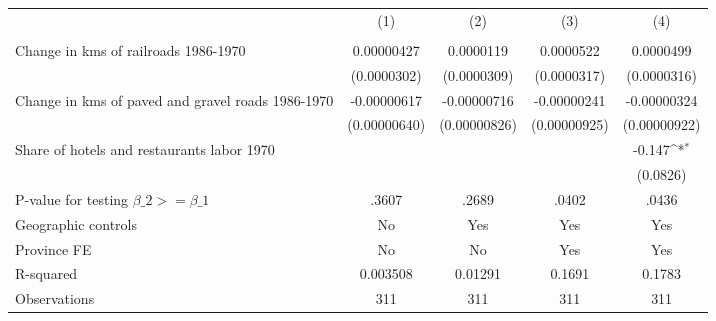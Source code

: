 {
\def\sym#1{\ifmmode^{#1}\else\(^{#1}\)\fi}
\begin{tabular}{l*{4}{c}}
\hline\hline
                &\multicolumn{1}{c}{(1)}&\multicolumn{1}{c}{(2)}&\multicolumn{1}{c}{(3)}&\multicolumn{1}{c}{(4)}\\
                &\multicolumn{1}{c}{}&\multicolumn{1}{c}{}&\multicolumn{1}{c}{}&\multicolumn{1}{c}{}\\
\hline
Change in kms of railroads 1986-1970&0.00000427         &0.0000119         &0.0000522         &0.0000499         \\
                &(0.0000302)         &(0.0000309)         &(0.0000317)         &(0.0000316)         \\
[1em]
Change in kms of paved and gravel roads 1986-1970&-0.00000617         &-0.00000716         &-0.00000241         &-0.00000324         \\
                &(0.00000640)         &(0.00000826)         &(0.00000925)         &(0.00000922)         \\
[1em]
Share of hotels and restaurants labor 1970&                  &                  &                  &   -0.147\sym{*}  \\
                &                  &                  &                  & (0.0826)         \\
\hline
P-value for testing $\beta\_{2} >= \beta\_{1}$&    .3607         &    .2689         &    .0402         &    .0436         \\
Geographic controls&       No         &      Yes         &      Yes         &      Yes         \\
Province FE     &       No         &       No         &      Yes         &      Yes         \\
R-squared       & 0.003508         &  0.01291         &   0.1691         &   0.1783         \\
Observations    &      311         &      311         &      311         &      311         \\
\hline\hline
\end{tabular}
}
